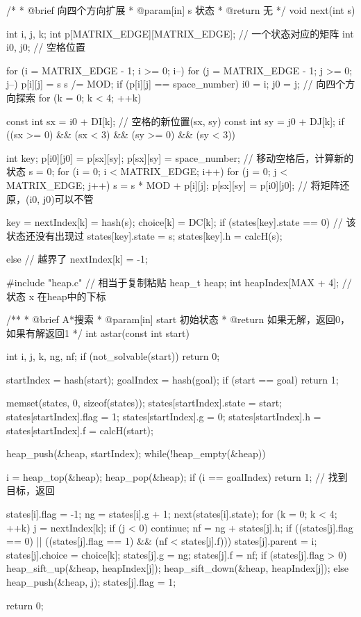 \begin{Codex}[label=eight_digits_astar.c]
/*
 * @brief 向四个方向扩展
 * @param[in] s 状态
 * @return 无
 */
void next(int s) {
    int i, j, k;
    int p[MATRIX_EDGE][MATRIX_EDGE]; // 一个状态对应的矩阵
    int i0, j0;  // 空格位置

    for (i = MATRIX_EDGE - 1; i >= 0; i--) {
        for (j = MATRIX_EDGE - 1; j >= 0; j--) {
            p[i][j] = s %
            s /= MOD;
            if (p[i][j] == space_number) {
                i0 = i;
                j0 = j;
            }
        }
    }
    // 向四个方向探索
    for (k = 0; k < 4; ++k) {
        const int sx = i0 + DI[k]; // 空格的新位置(sx, sy)
        const int sy = j0 + DJ[k];
        if ((sx >= 0) && (sx < 3) && (sy >= 0) && (sy < 3)) {
            int key;
            p[i0][j0] = p[sx][sy];
            p[sx][sy] = space_number;
            // 移动空格后，计算新的状态
            s = 0;
            for (i = 0; i < MATRIX_EDGE; i++)
                for (j = 0; j < MATRIX_EDGE; j++)
                    s = s * MOD + p[i][j];
            p[sx][sy] = p[i0][j0]; // 将矩阵还原，(i0, j0)可以不管
            
            key = nextIndex[k] = hash(s);
            choice[k] = DC[k];
            if (states[key].state == 0) { // 该状态还没有出现过
                states[key].state = s;
                states[key].h = calcH(s);
            }
        } else {// 越界了
            nextIndex[k] = -1;
        }
    }
}


#include "heap.c" // 相当于复制粘贴
heap_t heap;
int heapIndex[MAX + 4]; // 状态 x 在heap中的下标

/**
 * @brief A*搜索
 * @param[in] start 初始状态
 * @return 如果无解，返回0，如果有解返回1
 */
int astar(const int start) {
    int i, j, k, ng, nf;
    if (not_solvable(start)) return 0;

    startIndex = hash(start);
    goalIndex  = hash(goal);
    if (start == goal) return 1;
    
    memset(states, 0, sizeof(states));
    states[startIndex].state = start;
    states[startIndex].flag    = 1;
    states[startIndex].g       = 0;
    states[startIndex].h       = states[startIndex].f = calcH(start);

    heap_push(&heap, startIndex);
    while(!heap_empty(&heap)) {
        i = heap_top(&heap); heap_pop(&heap);
        if (i == goalIndex) return 1; // 找到目标，返回

        states[i].flag = -1;
        ng = states[i].g + 1;
        next(states[i].state);
        for (k = 0; k < 4; ++k) {
            j = nextIndex[k];
            if (j < 0) continue;
            nf = ng + states[j].h;
            if ((states[j].flag == 0) || ((states[j].flag == 1) &&
                (nf < states[j].f))) {
                states[j].parent = i;
                states[j].choice = choice[k];
                states[j].g    = ng;
                states[j].f    = nf;
                if (states[j].flag > 0) {
                    heap_sift_up(&heap, heapIndex[j]);
                    heap_sift_down(&heap, heapIndex[j]);
                } else {
                    heap_push(&heap, j);
                    states[j].flag = 1;
                }
            }
        }
    }
    return 0;
}


\end{Codex}
